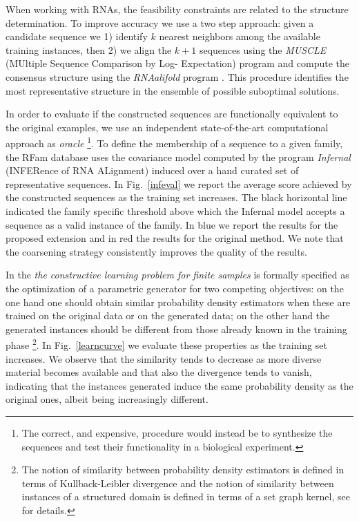 \documentclass{article}
\begin{document}
When working with RNAs, the feasibility constraints are related to the
structure determination. To improve accuracy we use a two step approach:
given a candidate sequence we 1) identify $k$ nearest neighbors among the
available training instances, then 2) we align the $k+1$ sequences using the
\emph{MUSCLE} (MUltiple Sequence Comparison by Log- Expectation) program
\citep{muscle} and compute the consensus structure using the \emph{RNAalifold}
program \citep{rnaalifold}. This procedure identifies
the most representative structure in the ensemble of possible suboptimal
solutions.

In order to evaluate if the constructed sequences are functionally equivalent
to the original examples, we use an independent state-of-the-art computational
approach as {\em oracle} \footnote{The correct, and expensive, procedure would
instead be to synthesize the sequences and test their functionality in a
biological experiment.}. To define the membership of a sequence to a given
family, the RFam database uses the covariance model computed by the program
\emph{Infernal} (INFERence of RNA ALignment) \citep{infernal} induced over a
hand curated set of representative sequences.
In Fig.~\ref{infeval} we report the average score achieved by the constructed
sequences as the training set increases. The black horizontal line indicated
the family specific threshold above which the Infernal model accepts a
sequence as a valid instance of the family. In blue we report the results for
the proposed extension and in red the results for the original method. We note
that the coarsening strategy consistently improves the quality of the results. 

In \cite{costa16} the \emph{the constructive learning problem for finite
samples} is formally specified as the optimization of a parametric generator
for two competing objectives: on the one hand one should obtain similar
probability density estimators when these are trained on the original data or
on the generated data; on the other hand the generated instances should be
different from those already known in the training phase \footnote{The notion
of similarity between probability density estimators is defined in terms of
Kullback-Leibler divergence and the notion of similarity between instances of
a structured domain is defined in terms of a set graph kernel, see
\citep{costa16} for details.}. In Fig.~\ref{learncurve} we evaluate these
properties as the training set increases. We observe that the similarity tends
to decrease as more diverse material becomes available and that also the
divergence tends to vanish, indicating that the instances generated induce the
same probability density as the original ones, albeit being increasingly
different.
\end{document}
